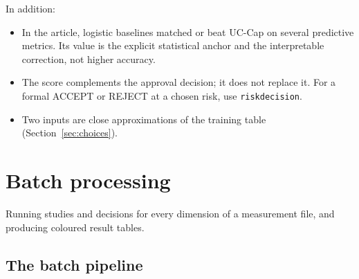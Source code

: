 \documentclass[a4paper,11pt,oneside,openany,parskip=half-,headings=standardclasses,toc=flat,numbers=noenddot]{scrbook}
\newcommand{\code}[1]{\texttt{\begingroup\def\_{\textunderscore\allowbreak}#1\endgroup}}
\newenvironment{chapterintro}{\begingroup\sffamily\small\color{muted}\noindent\ignorespaces}{\par\endgroup\medskip}
\newcommand{\secref}[1]{Section~\ref{#1}}
\begin{document}
In addition:
\begin{itemize}
\item In the article, logistic baselines matched or beat UC-Cap on several predictive metrics. Its value is the
  explicit statistical anchor and the interpretable correction, not higher accuracy.
\item The score complements the approval decision; it does not replace it. For a formal ACCEPT or REJECT at a
  chosen risk, use \code{risk\_decision}.
\item Two inputs are close approximations of the training table (\secref{sec:choices}).
\end{itemize}

\chapter{Batch processing}\label{ch:batch}

\begin{chapterintro}
Running studies and decisions for every dimension of a measurement file, and producing coloured result tables.
\end{chapterintro}

\section{The batch pipeline}
\end{document}
